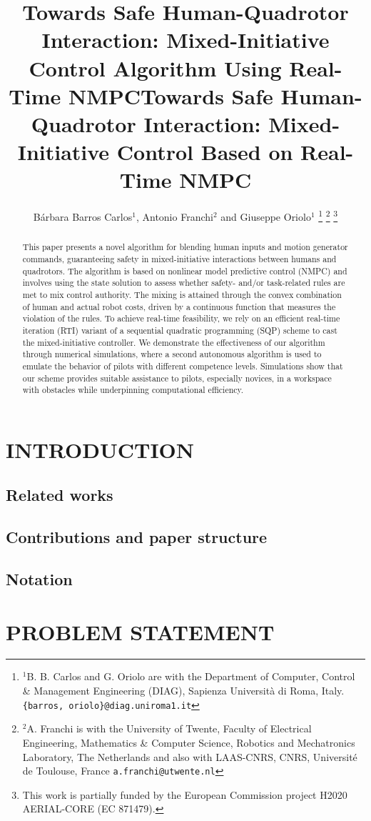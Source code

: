 \documentclass[letterpaper, 10 pt, journal, twoside]{IEEEtran}
\title{ Towards Safe Human-Quadrotor Interaction: Mixed-Initiative Control Algorithm Using Real-Time NMPC}
\title{\bf Towards Safe Human-Quadrotor Interaction: Mixed-Initiative Control Based on Real-Time NMPC}
\author{B\'arbara Barros Carlos$^{1}$, Antonio Franchi$^{2}$ and Giuseppe Oriolo$^{1}$%
\thanks{$^{1}$B. B. Carlos and G. Oriolo are with the Department of Computer, Control \& Management Engineering (DIAG), Sapienza Universit\`a di Roma, Italy.
        {\tt\footnotesize \{barros, oriolo\}@diag.uniroma1.it}}%
\thanks{$^{2}$A. Franchi is with the University of Twente, 
Faculty of Electrical Engineering, Mathematics \& Computer Science,  Robotics and Mechatronics Laboratory, The Netherlands and also with LAAS-CNRS, CNRS, Universit\'e de Toulouse, France
        {\tt\footnotesize a.franchi@utwente.nl}}%
\thanks{This work is partially funded by the European Commission project H2020 AERIAL-CORE (EC 871479).}%
}
\begin{document}
\maketitle
\thispagestyle{empty}
\pagestyle{empty}

\begin{abstract}
This paper presents a novel algorithm for blending human inputs and motion generator commands, guaranteeing safety in mixed-initiative interactions between humans and quadrotors. The algorithm is based on nonlinear model predictive control (NMPC) and involves using the state solution to assess whether safety- and/or task-related rules are met to mix control authority. The mixing is attained through the convex combination of human and actual robot costs, driven by a continuous function that measures the violation of the rules. To achieve real-time feasibility, we rely on an efficient real-time iteration (RTI) variant of a sequential quadratic programming (SQP) scheme to cast the mixed-initiative controller. We demonstrate the effectiveness of our algorithm through numerical simulations, where a second autonomous algorithm is used to emulate the behavior of pilots with different competence levels. Simulations show that our scheme provides suitable assistance to pilots, especially novices, in a workspace with obstacles while underpinning computational efficiency. 
\end{abstract}
\section{INTRODUCTION}

\subsection{Related works}

\subsection{Contributions and paper structure}

\subsection{Notation}

\section{PROBLEM STATEMENT}\label{sec:problem_statement}

\end{document}
